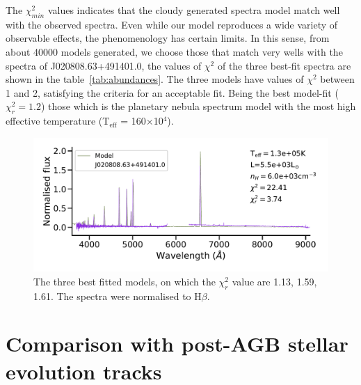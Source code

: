 \documentclass[fleqn,usenatbib]{mnras}
\begin{document}
The $\chi^{2}_{min}$ values indicates that the {\sc cloudy} generated
spectra model match well with the observed spectra. Even while our model reproduces
a wide variety of observable effects, the phenomenology has certain limits.
In this sense, from about 40000 models generated, we choose those that
match very wells with the spectra of J020808.63+491401.0,
the values of $\chi^{2}$ of the three best-fit spectra
are shown in the table~\ref{tab:abundances}. The three
models have values of $\chi^{2}$ between 1 and 2, satisfying
the criteria for an acceptable fit. Being the best model-fit ($\chi^{2}_{r} = 1.2$)
those which is the  planetary nebula spectrum model with the
most high effective temperature (T$_{\text{eff}}$ = 160$\times$10$^{4}$).

\begin{figure}
\centering
\includegraphics[width=\linewidth, trim=10 90 10 10, clip]{Figs/model_130000_37.32_3.78.pdf}
\caption{The three best fitted models, on which the $\chi^2_r$ value are 1.13, 1.59, 1.61.
  The spectra were normalised to H{$\beta$}.} 
  \label{fig:spectra-obs-model}
\end{figure}

\section{Comparison with post-AGB stellar evolution tracks}
\label{sec:tracks}
\end{document}
